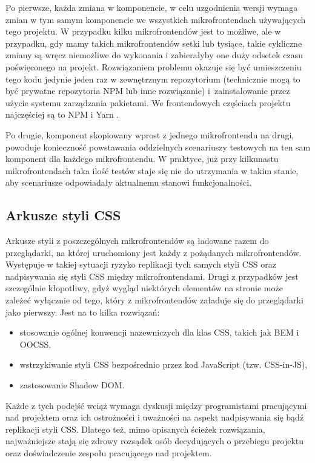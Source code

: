 \documentclass{SGGW-thesis}
\begin{document}
Po pierwsze, każda zmiana w komponencie, w celu uzgodnienia wersji wymaga zmian w tym samym komponencie we wszystkich mikrofrontendach używających tego projektu. W przypadku kilku mikrofrontendów jest to możliwe, ale w przypadku, gdy mamy takich mikrofrontendów setki lub tysiące, takie cykliczne zmiany są wręcz niemożliwe do wykonania i zabierałyby one duży odsetek czasu poświęconego na projekt.
Rozwiązaniem problemu okazuje się być umieszczeniu tego kodu jedynie jeden raz w zewnętrznym repozytorium (technicznie mogą to być prywatne repozytoria NPM lub inne rozwiązanie) i~zainstalowanie przez użycie systemu zarządzania pakietami. We frontendowych częściach projektu najczęściej są to NPM \cite{npm} i Yarn \cite{yarn}.

Po drugie, komponent skopiowany wprost z jednego mikrofrontendu na drugi, powoduje konieczność powstawania oddzielnych scenariuszy testowych na ten sam komponent dla każdego mikrofrontendu. W praktyce, już przy kilkunastu mikrofrontendach taka ilość testów staje się nie do utrzymania w takim stanie, aby scenariusze odpowiadały aktualnemu stanowi funkcjonalności.

\subsection{Arkusze styli CSS}
Arkusze styli z poszczególnych mikrofrontendów są ładowane razem do przeglądarki, na której uruchomiony jest każdy z pożądanych mikrofrontendów. Występuje w takiej sytuacji ryzyko replikacji tych samych styli CSS oraz nadpisywania się styli CSS między mikrofrontendami. Drugi z przypadków jest szczególnie kłopotliwy, gdyż wygląd niektórych elementów na stronie może zależeć wyłącznie od tego, który z mikrofrontendów załaduje się do przeglądarki jako pierwszy. Jest na to kilka rozwiązań:

\begin{itemize}
	\item stosowanie ogólnej konwencji nazewniczych dla klas CSS, takich jak BEM i OOCSS,
	\item wstrzykiwanie styli CSS bezpośrednio przez kod JavaScript (tzw. CSS-in-JS),
	\item zastosowanie Shadow DOM.
\end{itemize}

Każde z tych podejść wciąż wymaga dyskusji między programistami pracującymi nad projektem oraz ich ostrożności i uważności na aspekt nadpisywania się bądź replikacji styli CSS. Dlatego też, mimo opisanych ścieżek rozwiązania, najważniejsze stają się zdrowy rozsądek osób decydujących o przebiegu projektu oraz doświadczenie zespołu pracującego nad projektem.
\end{document}
